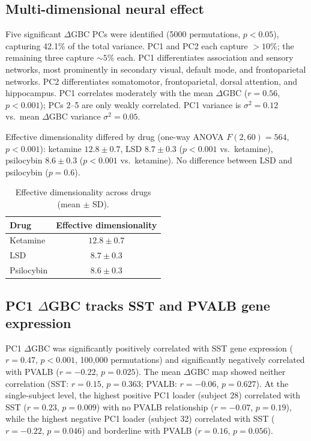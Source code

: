 \documentclass[11pt]{article}
\begin{document}
\subsection{Multi-dimensional neural effect}
Five significant $\Delta$GBC PCs were identified (5000 permutations, $p<0.05$), capturing 42.1\% of the total variance. PC1 and PC2 each capture $>10\%$; the remaining three capture $\sim 5\%$ each. PC1 differentiates association and sensory networks, most prominently in secondary visual, default mode, and frontoparietal networks. PC2 differentiates somatomotor, frontoparietal, dorsal attention, and hippocampus. PC1 correlates moderately with the mean $\Delta$GBC ($r=0.56$, $p<0.001$); PCs 2--5 are only weakly correlated. PC1 variance is $\sigma^2=0.12$ vs.\ mean $\Delta$GBC variance $\sigma^2=0.05$.

Effective dimensionality differed by drug (one-way ANOVA $F(2,60)=564$, $p<0.001$): ketamine $12.8 \pm 0.7$, LSD $8.7 \pm 0.3$ ($p<0.001$ vs.\ ketamine), psilocybin $8.6 \pm 0.3$ ($p<0.001$ vs.\ ketamine). No difference between LSD and psilocybin ($p=0.6$).

\begin{table}[h]
\centering
\caption{Effective dimensionality across drugs (mean $\pm$ SD).}
\begin{tabular}{lc}
\toprule
Drug & Effective dimensionality \\
\midrule
Ketamine & $12.8 \pm 0.7$ \\
LSD      & $8.7 \pm 0.3$ \\
Psilocybin & $8.6 \pm 0.3$ \\
\bottomrule
\end{tabular}
\end{table}

\subsection{PC1 $\Delta$GBC tracks SST and PVALB gene expression}
PC1 $\Delta$GBC was significantly positively correlated with SST gene expression ($r=0.47$, $p<0.001$, 100,000 permutations) and significantly negatively correlated with PVALB ($r=-0.22$, $p=0.025$). The mean $\Delta$GBC map showed neither correlation (SST: $r=0.15$, $p=0.363$; PVALB: $r=-0.06$, $p=0.627$). At the single-subject level, the highest positive PC1 loader (subject 28) correlated with SST ($r=0.23$, $p=0.009$) with no PVALB relationship ($r=-0.07$, $p=0.19$), while the highest negative PC1 loader (subject 32) correlated with SST ($r=-0.22$, $p=0.046$) and borderline with PVALB ($r=0.16$, $p=0.056$).
\end{document}
